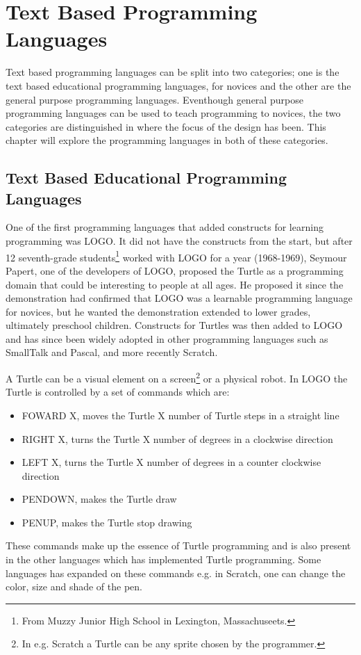 \section{Text Based Programming Languages}
Text based programming languages can be split into two categories; one is the text based educational programming languages, for novices and the other are the general purpose programming languages. Eventhough general purpose programming languages can be used to teach programming to novices, the two categories are distinguished in where the focus of the design has been. This chapter will explore the programming languages in both of these categories.

\subsection{Text Based Educational Programming Languages}
One of the first programming languages that added constructs for learning programming was LOGO. It did not have the constructs from the start, but after 12 seventh-grade students\footnote{From Muzzy Junior High School in Lexington, Massachuseets.} worked with LOGO for a year (1968-1969), Seymour Papert, one of the developers of LOGO, proposed the Turtle as a programming domain that could be interesting to people at all ages. He proposed it since the demonstration had confirmed that LOGO was a learnable programming language for novices, but he wanted the demonstration extended to lower grades, ultimately preschool children. Constructs for Turtles was then added to LOGO and has since been widely adopted in other programming languages such as SmallTalk and Pascal, and more recently Scratch.

A Turtle can be a visual element on a screen\footnote{In e.g. Scratch a Turtle can be any sprite chosen by the programmer.} or a physical robot. In LOGO the Turtle is controlled by a set of commands which are:
\begin{itemize}
\item FOWARD X, moves the Turtle X number of Turtle steps in a straight line
\item RIGHT X, turns the Turtle X number of degrees in a clockwise direction
\item LEFT X, turns the Turtle X number of degrees in a counter clockwise direction
\item PENDOWN, makes the Turtle draw
\item PENUP, makes the Turtle stop drawing
\end{itemize}
These commands make up the essence of Turtle programming and is also present in the other languages which has implemented Turtle programming. Some languages has expanded on these commands e.g. in Scratch, one can change the color, size and shade of the pen.

